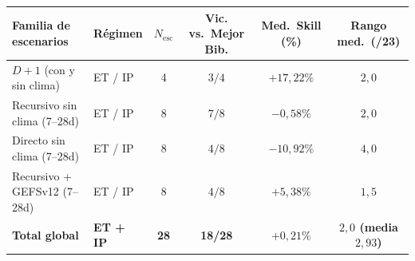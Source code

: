 \scriptsize
\setlength{\tabcolsep}{2.2pt}
\begin{tabular}{@{}llcccc@{}}
\toprule
Familia de escenarios & Régimen & $N_{\text{esc}}$ & Vic. vs.\ Mejor Bib. & Med.\ Skill (\%) & Rango med.\ (/23) \\
\midrule
$D+1$ (con y sin clima) & ET / IP & 4 & $3/4$ & $+17{,}22\%$ & $2{,}0$ \\
Recursivo sin clima (7--28d) & ET / IP & 8 & $7/8$ & $-0{,}58\%$ & $2{,}0$ \\
Directo sin clima (7--28d) & ET / IP & 8 & $4/8$ & $-10{,}92\%$ & $4{,}0$ \\
Recursivo + GEFSv12 (7--28d) & ET / IP & 8 & $4/8$ & $+5{,}38\%$ & $1{,}5$ \\
\midrule
\textbf{Total global} & \textbf{ET + IP} & \textbf{28} & \textbf{18/28} & \textbf{$+0{,}21\%$} & \textbf{$2{,}0$ (media $2{,}93$)} \\
\bottomrule
\end{tabular}
